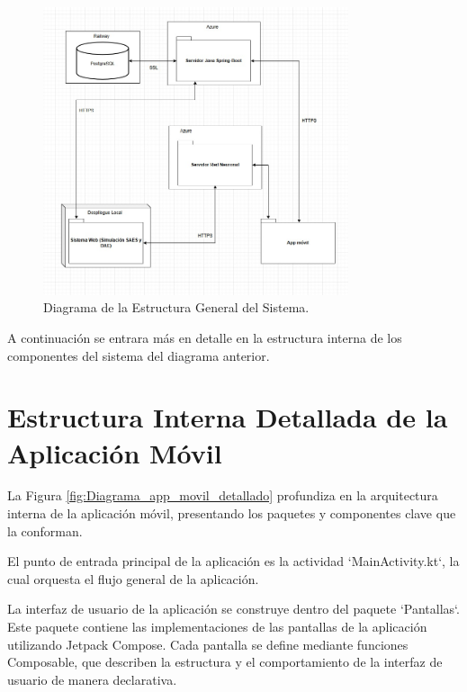 \begin{figure}[htbp!]
	\begin{center}
		\includegraphics[width=0.8\textwidth]{images/DiagramaGeneralClases}
		\caption{Diagrama de la Estructura General del Sistema.}
		\label{fig:Diagrama de sistemas}
	\end{center}
\end{figure}

A continuación se entrara más en detalle en la estructura interna de los componentes del sistema del diagrama anterior.

\newpage

\section{Estructura Interna Detallada de la Aplicación Móvil} 

La Figura \ref{fig:Diagrama_app_movil_detallado} profundiza en la arquitectura interna de la aplicación móvil, presentando los paquetes y componentes clave que la conforman. 

El punto de entrada principal de la aplicación es la actividad `MainActivity.kt`, la cual orquesta el flujo general de la aplicación. 

La interfaz de usuario de la aplicación se construye dentro del paquete `Pantallas`. Este paquete contiene las implementaciones de las pantallas de la aplicación utilizando Jetpack Compose. Cada pantalla se define mediante funciones Composable, que describen la estructura y el comportamiento de la interfaz de usuario de manera declarativa. 

